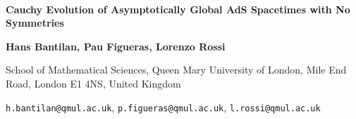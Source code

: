 \documentclass[a4paper,11pt]{article}
\numberwithin{equation}{section}
\begin{document}
 \begin{titlepage}

\thispagestyle{empty}

$\,$


\vspace{40pt}  
	 
\begin{center}

{\huge \textbf{Cauchy Evolution of Asymptotically Global AdS Spacetimes with No Symmetries}}

\vspace{30pt}
		
{\large \bf Hans Bantilan, Pau Figueras,  Lorenzo Rossi}
		

\vspace{25pt}


{\normalsize  
School of Mathematical Sciences, Queen Mary University of London, Mile End Road, London E1 4NS, United Kingdom}

\vspace{10pt}
\texttt{h.bantilan@qmul.ac.uk}, \texttt{p.figueras@qmul.ac.uk}, \texttt{l.rossi@qmul.ac.uk}


\vspace{40pt}
				

\end{center}
\end{titlepage}
\end{document}
